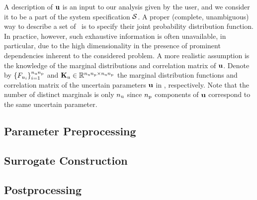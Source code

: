 A description of $\mathbf{u}$ is an input to our analysis given by the user, and we consider it to be a part of the system specification $\mathcal{S}$.
A proper (complete, unambiguous) way to describe a set of \rvs\ is to specify their joint probability distribution function.
In practice, however, such exhaustive information is often unavailable, in particular, due to the high dimensionality in the presence of prominent dependencies inherent to the considered problem.
A more realistic assumption is the knowledge of the marginal distributions and correlation matrix of $\mathbf{u}$.
Denote by $\{ F_{u_i} \}_{i = 1}^{{n_\text{u}} {n_\text{p}}}$ and $\mathbf{K}_u \in \mathbb{R}^{{n_\text{u}} {n_\text{p}} \times {n_\text{u}} {n_\text{p}}}$ the marginal distribution functions and correlation matrix of the uncertain parameters $\mathbf{u}$ in , respectively.
Note that the number of distinct marginals is only ${n_\text{u}}$ since ${n_\text{p}}$ components of $\mathbf{u}$ correspond to the same uncertain parameter.

\subsection{Parameter Preprocessing} 


\subsection{Surrogate Construction}


\subsection{Postprocessing} 

